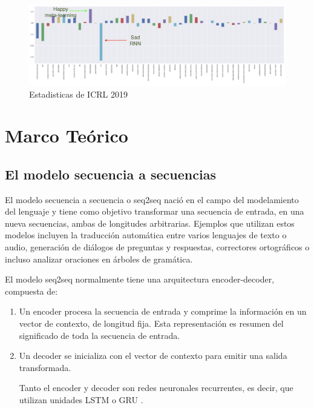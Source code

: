 \documentclass[conference]{IEEEtran}
\begin{document}
\begin{figure}[h]
	\centering
	\includegraphics[scale=.2]{imagenes/rnn.png}
	\caption{Estadisticas de ICRL 2019} 
\end{figure}




\section{Marco Te\'orico}

\subsection{El modelo secuencia a secuencias}
El modelo secuencia a secuencia o seq2seq naci\'o en el campo del modelamiento del lenguaje \cite{b6} y tiene como objetivo transformar una secuencia de entrada, en una nueva secuencias, ambas de longitudes arbitrarias. Ejemplos que utilizan estos modelos  incluyen la traducci\'on autom\'atica entre varios lenguajes de texto o audio, generaci\'on de di\'alogos de preguntas y respuestas, correctores ortogr\'aficos o incluso analizar oraciones en \'arboles de gram\'atica.

\vspace{0.2cm}

El modelo seq2seq normalmente tiene una arquitectura encoder-decoder, compuesta de:

\begin{enumerate}
\item Un encoder procesa la secuencia de entrada y comprime la informaci\'on en un vector de contexto, de  longitud fija. Esta representaci\'on es resumen del significado de toda la secuencia de entrada.
\item Un decoder se inicializa con el vector de contexto para emitir una salida transformada. 

Tanto el encoder y decoder son redes neuronales recurrentes, es decir, que utilizan unidades LSTM \cite{b17, b18} o GRU \cite{b19}. 

\end{enumerate}
\end{document}
